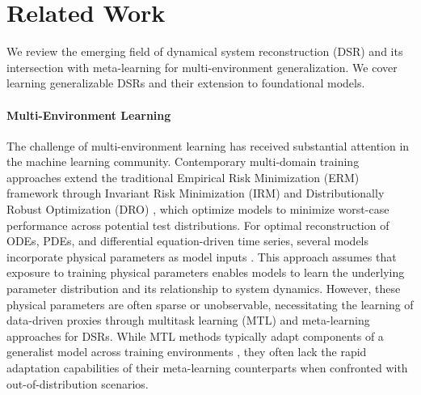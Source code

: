 \section{Related Work}
\label{relatedwork}

We review the emerging field of dynamical system reconstruction (DSR) and its intersection with meta-learning for multi-environment generalization. We cover learning generalizable DSRs and their extension to foundational models.

\paragraph{Multi-Environment Learning} The challenge of multi-environment learning has received substantial attention in the machine learning community. Contemporary multi-domain training approaches extend the traditional Empirical Risk Minimization (ERM) framework through Invariant Risk Minimization (IRM) \cite{arjovsky2019invariant} and Distributionally Robust Optimization (DRO) \cite{ben2013robust,sagawa2020distributionally,krueger2021out}, which optimize models to minimize worst-case performance across potential test distributions. For optimal reconstruction of ODEs, PDEs, and differential equation-driven time series, several models incorporate physical parameters as model inputs \cite{brandstetter2022message,takamoto2023learning}. This approach assumes that exposure to training physical parameters enables models to learn the underlying parameter distribution and its relationship to system dynamics. However, these physical parameters are often sparse or unobservable, necessitating the learning of data-driven proxies through multitask learning (MTL) \cite{caruana1997multitask} and meta-learning \cite{hospedales2021meta} approaches for DSRs. While MTL methods typically adapt components of a generalist model across training environments \cite{yin2021leads}, they often lack the rapid adaptation capabilities of their meta-learning counterparts when confronted with out-of-distribution scenarios.

